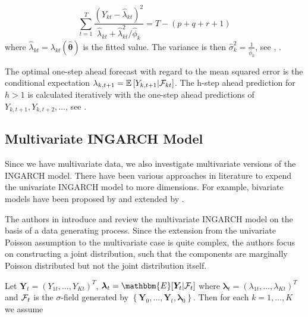 \begin{equation}
\sum_{t=1}^T \frac{(Y_{kt}-\hat{\lambda}_{kt})^2}{\hat{\lambda}_{kt}+\hat{\lambda}^2_{kt}/\hat{\phi}_k} = T - (p+q+r+1)
\label{eq:Dispersion Parameter Estimation}
\end{equation}
%
where $\hat{\lambda}_{kt} = \lambda_{kt}(\hat{\bm{\theta}})$ is the fitted value. The variance is then $\hat{\sigma}_k^2=\frac{1}{\hat{\phi}_k}$, see \textcite{Fokianos:2014}, \textcite{Liboschik:2016}. 

The optimal one-step ahead forecast with regard to the mean squared error is the conditional expectation $\lambda_{k,t+1}=\mathbb{E}\left[Y_{k,t+1} | \mathcal{F}_{kt} \right]$. The h-step ahead prediction for $h>1$ is calculated iteratively with the one-step ahead predictions of $Y_{k,t+1},Y_{k,t+2},\ldots$, see \textcite{Liboschik:2016}. 

\subsection{Multivariate INGARCH Model}
\label{sec: Multivariate Ingarch}

Since we have multivariate data, we also investigate multivariate versions of the INGARCH model. There have been various approaches in literature to expend the univariate INGARCH model to more dimensions. For example, bivariate models have been proposed by \textcite{Liu:2012} and  extended by \textcite{Cui:2018}. 

The authors in \textcite{Fokianos:2020,Fokianos:2021} introduce and review the multivariate INGARCH model on the basis of a data generating process. Since the extension from the univariate Poisson assumption to the multivariate case is quite complex, the authors focus on constructing a joint distribution, such that the components are marginally Poisson distributed but not the joint distribution itself. 

Let $\bm{Y}_t=(Y_{1t},\ldots,Y_{Kt})^T$, $\bm{\lambda}_t=\mathbbm{E}[\bm{Y}_t|\SigA_t]$ where $\bm{\lambda}_t = (\lambda_{1t},\ldots,\lambda_{Kt})^T$ and $\mathcal{F}_t$ is the $\sigma$-field generated by $\left\{\bm{Y}_0,\ldots,\bm{Y}_t,\bm{\lambda}_0\right\}$. Then for each $k=1,\ldots,K$ we assume

